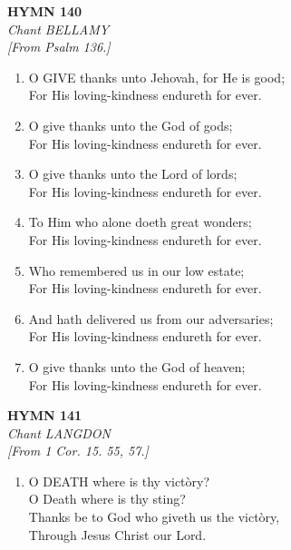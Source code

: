 \newpage
\begin{center}
    {\Large \textbf{HYMN 140}}
    \\
    \textit{Chant BELLAMY}
    \\
    \textit{\small [From Psalm 136.]}
\end{center}
\vspace{1em}

\begin{enumerate}
    \item O GIVE thanks unto Jehovah, for He is good; \\
        For His loving-kindness endureth for ever.

    \item O give thanks unto the God of gods; \\
        For His loving-kindness endureth for ever.

    \item O give thanks unto the Lord of lords; \\
        For His loving-kindness endureth for ever.

    \item To Him who alone doeth great wonders; \\
        For His loving-kindness endureth for ever.

    \item Who remembered us in our low estate; \\
        For His loving-kindness endureth for ever.

    \item And hath delivered us from our adversaries; \\
        For His loving-kindness endureth for ever.

    \item O give thanks unto the God of heaven; \\
        For His loving-kindness endureth for ever.

\end{enumerate}

\newpage
\begin{center}
    {\Large \textbf{HYMN 141}}
    \\
    \textit{Chant LANGDON}
    \\
    \textit{\small [From 1 Cor. 15. 55, 57.]}
\end{center}
\vspace{1em}

\begin{enumerate}
    \item O DEATH where is thy vict\`ory? \\
        O Death where is thy sting? \\
        Thanks be to God who giveth us the vict\`ory, \\
        Through Jesus Christ our Lord.

\end{enumerate}

